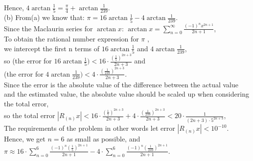 \documentclass[12pt,reqno]{amsart}
\begin{document}
Hence, $4 \arctan\frac{1}{5}=\frac{\pi}{4}+\arctan \frac{1}{239}$.
\\(b)
From(a) we know that:
$\pi=16\arctan \frac{1}{5} -4\arctan \frac{1}{239} $.
\\Since the Maclaurin series for $\arctan x$:
$\arctan x=\sum\limits_{n=0}^\infty \frac{(-1)^{n} x^{2n+1}  }{ 2n+1 }$,\\
To obtain the rational number expression for $\pi$
,\\ we intercept the first n terms of $16\arctan \frac{1}{5}$ and $4\arctan \frac{1}{239}$,
\\so (the error for $16\arctan \frac{1}{5})<16\cdot\frac{(\frac{1}{5})^{2n+3}}{2n+3}$ and \\(the error for $4\arctan \frac{1}{239})<4\cdot\frac{(\frac{1}{239})^{2n+3}}{2n+3}$.
\\
Since the error is the absolute value of the difference between the actual value and the estimated value, the absolute value should be scaled up when considering the total error,
\\so the total error $|R_{(n)}x|< 16\cdot\frac{(\frac{1}{5})^{2n+3}}{2n+3}+4\cdot\frac{(\frac{1}{239})^{2n+3}}{2n+3} <20\cdot \frac{1}{(2n+3)\cdot 5^{2n+3}}$,
\\ The requirements of the problem in other words let error $|R_{(n)}x|<10^{-10}$.
\\Hence, we get $n=6$ as small as possible, and $\pi \approx 16\cdot \sum\limits_{n=0}^6 \frac{(-1)^n (\frac{1}{5} )^{2n+1} }{2n+1}-4\cdot \sum\limits_{n=0}^6 \frac{(-1)^n (\frac{1}{239} )^{2n+1} }{2n+1}$.
\end{document}
